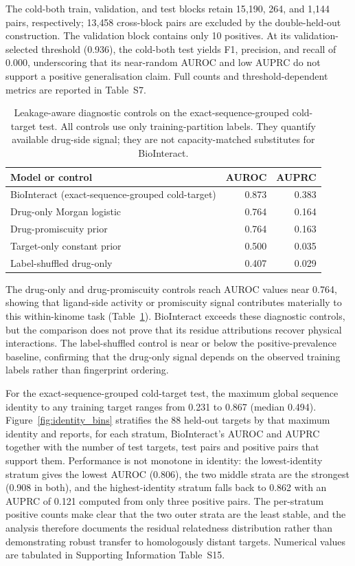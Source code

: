 \documentclass[fleqn,10pt]{wlscirep}
\begin{document}
The cold-both train, validation, and test blocks retain 15{,}190, 264, and
1{,}144 pairs, respectively; 13{,}458 cross-block pairs are excluded by the
double-held-out construction. The validation block contains only 10 positives.
At its validation-selected threshold (0.936), the cold-both test yields F1,
precision, and recall of 0.000, underscoring that its near-random AUROC and low
AUPRC do not support a positive generalisation claim. Full counts and
threshold-dependent metrics are reported in Table~S7.

\begin{table}[htbp]
\centering
\caption{Leakage-aware diagnostic controls on the exact-sequence-grouped
  cold-target test. All controls use only training-partition labels. They
  quantify available drug-side signal; they are not capacity-matched substitutes
  for BioInteract.}
\label{tab:diagnostic_controls}
\begin{tabular}{lrr}
\toprule
\textbf{Model or control} & \textbf{AUROC} & \textbf{AUPRC} \\
\midrule
BioInteract (exact-sequence-grouped cold-target) & 0.873 & 0.383 \\
Drug-only Morgan logistic         & 0.764 & 0.164 \\
Drug-promiscuity prior            & 0.764 & 0.163 \\
Target-only constant prior        & 0.500 & 0.035 \\
Label-shuffled drug-only          & 0.407 & 0.029 \\
\bottomrule
\end{tabular}
\end{table}

The drug-only and drug-promiscuity controls reach AUROC values near 0.764,
showing that ligand-side activity or promiscuity signal contributes materially
to this within-kinome task (Table~\ref{tab:diagnostic_controls}).  BioInteract
exceeds these diagnostic controls, but the comparison does not prove that its
residue attributions recover physical interactions.  The label-shuffled control
is near or below the positive-prevalence baseline, confirming that the drug-only
signal depends on the observed training labels rather than fingerprint ordering.

For the exact-sequence-grouped cold-target test, the maximum global sequence
identity to any training target ranges from 0.231 to 0.867 (median 0.494).
Figure~\ref{fig:identity_bins} stratifies the 88 held-out targets by that
maximum identity and reports, for each stratum, BioInteract's AUROC and AUPRC
together with the number of test targets, test pairs and positive pairs that
support them.  Performance is not monotone in identity: the lowest-identity
stratum gives the lowest AUROC (0.806), the two middle strata are the strongest
(0.908 in both), and the highest-identity stratum falls back to 0.862 with an
AUPRC of 0.121 computed from only three positive pairs.  The per-stratum
positive counts make clear that the two outer strata are the least stable, and
the analysis therefore documents the residual relatedness distribution rather
than demonstrating robust transfer to homologously distant targets.  Numerical
values are tabulated in Supporting Information Table~S15.
\end{document}
